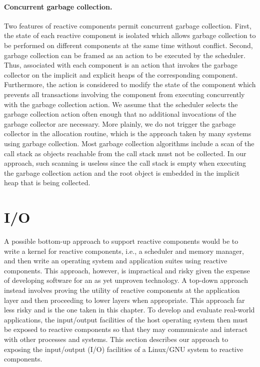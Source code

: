\paragraph{Concurrent garbage collection.}
Two features of reactive components permit concurrent garbage collection.
First, the state of each reactive component is isolated which allows garbage collection to be performed on different components at the same time without conflict.
Second, garbage collection can be framed as an action to be executed by the scheduler.
Thus, associated with each component is an action that invokes the garbage collector on the implicit and explicit heaps of the corresponding component.
Furthermore, the action is considered to modify the state of the component which prevents all transactions involving the component from executing concurrently with the garbage collection action.
We assume that the scheduler selects the garbage collection action often enough that no additional invocations of the garbage collector are necessary.
More plainly, we do not trigger the garbage collector in the allocation routine, which is the approach taken by many systems using garbage collection.
Most garbage collection algorithms include a scan of the call stack as objects reachable from the call stack must not be collected.
In our approach, such scanning is useless since the call stack is empty when executing the garbage collection action and the root object is embedded in the implicit heap that is being collected.

\section{I/O}

A possible bottom-up approach to support reactive components would be to write a kernel for reactive components, i.e., a scheduler and memory manager, and then write an operating system and application suites using reactive components.
This approach, however, is impractical and risky given the expense of developing software for an as yet unproven technology.
A top-down approach instead involves proving the utility of reactive components at the application layer and then proceeding to lower layers when appropriate.
This approach far less risky and is the one taken in this chapter.
To develop and evaluate real-world applications, the input/output facilities of the host operating system then must be exposed to reactive components so that they may communicate and interact with other processes and systems.
This section describes our approach to exposing the input/output (I/O) facilities of a Linux/GNU system to reactive components.

